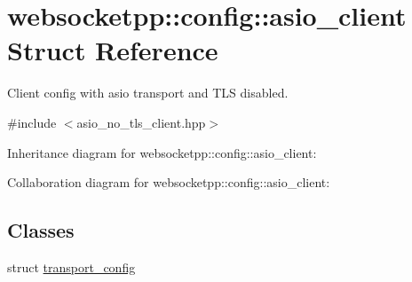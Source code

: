 \hypertarget{structwebsocketpp_1_1config_1_1asio__client}{}\section{websocketpp\+:\+:config\+:\+:asio\+\_\+client Struct Reference}
\label{structwebsocketpp_1_1config_1_1asio__client}


Client config with asio transport and T\+LS disabled.  




{\ttfamily \#include $<$asio\+\_\+no\+\_\+tls\+\_\+client.\+hpp$>$}



Inheritance diagram for websocketpp\+:\+:config\+:\+:asio\+\_\+client\+:


Collaboration diagram for websocketpp\+:\+:config\+:\+:asio\+\_\+client\+:
\subsection*{Classes}
\begin{DoxyCompactItemize}
\item 
struct \mbox{\hyperlink{structwebsocketpp_1_1config_1_1asio__client_1_1transport__config}{transport\+\_\+config}}
\end{DoxyCompactItemize}

